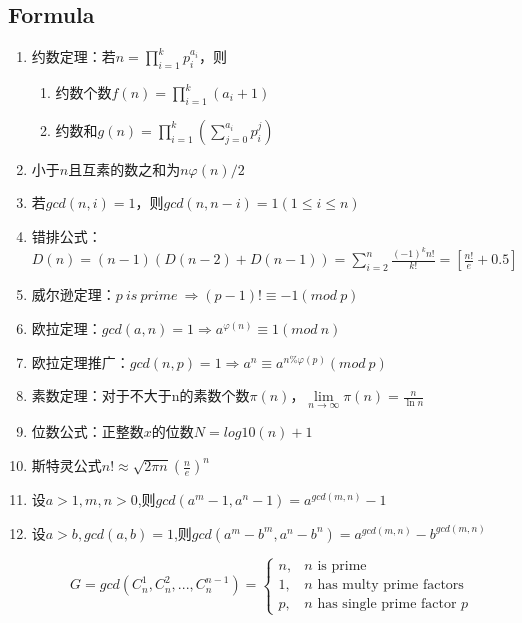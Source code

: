 \documentclass[twoside]{article}
\begin{document}
\subsection{Formula}
\begin{enumerate}
\item 约数定理：若$n=\prod_{i=1}^kp_i^{a_i}$，则

\begin{enumerate}
\item 约数个数$f(n)=\prod_{i=1}^k(a_i+1)$
\item 约数和$g(n)=\prod_{i=1}^k(\sum_{j=0}^{a_i}p_i^j)$
\end{enumerate}

\item 小于$n$且互素的数之和为$n\varphi(n)/2$

\item 若$gcd(n,i)=1$，则$gcd(n,n-i)=1(1\leq i\leq n)$

\item 错排公式：$D(n)=(n-1)(D(n-2)+D(n-1))=\sum_{i=2}^n\frac{(-1)^kn!}{k!}=[\frac{n!}{e}+0.5]$

\item 威尔逊定理：$p\ is\ prime\ \Rightarrow (p-1)!\equiv-1(mod\ p)$

\item 欧拉定理：$gcd(a,n)=1\Rightarrow a^{\varphi(n)}\equiv1(mod\ n)$

\item 欧拉定理推广：$gcd(n,p)=1\Rightarrow a^n\equiv a^{n\%\varphi(p)}(mod\ p)$

\item 素数定理：对于不大于n的素数个数$\pi(n)$，$\lim\limits_{n\to\infty}\pi(n)=\frac{n}{\ln n}$

\item 位数公式：正整数$x$的位数$N=log10(n)+1$

\item 斯特灵公式$n!\approx\sqrt{2\pi n}(\frac{n}{e})^n$

\item 设$a>1,m,n>0$,则$gcd(a^m-1,a^n-1)=a^{gcd(m,n)}-1$

\item 设$a>b,gcd(a,b)=1$,则$gcd(a^m-b^m,a^n-b^n)=a^{gcd(m,n)}-b^{gcd(m,n)}$

$$
G=gcd(C_n^1,C_n^2,...,C_n^{n-1})=
\begin{cases}
	n, & \text{$n$ is prime} \\
	1, & \text{$n$ has multy prime factors} \\
	p, & \text{$n$ has single prime factor $p$}
\end{cases}
$$


\end{enumerate}
\end{document}
